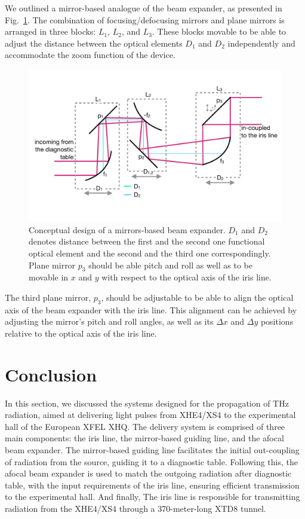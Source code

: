     We outlined a mirror-based analogue of the beam expander, as presented in Fig.~\ref{Fig:beam_expander}. The combination of focusing/defocusing mirrors and plane mirrors is arranged in three blocks: $L_1$, $L_2$, and $L_3$. These blocks movable to be able to adjust the distance between the optical elements $D_1$ and $D_2$ independently and accommodate the zoom function of the device.
    \begin{figure}[h]
    	\centering
    		\includegraphics[trim={0 0cm 0 0cm}, width=0.99\linewidth]{content/images/transport/beam_expander.pdf}
    		\centering
            \captionsetup{justification=centering}
        	\caption{Conceptual design of a mirrors-based beam expander. $D_1$ and $D_2$ denotes distance between the first and the second one functional optical element and the second and the third one correspondingly. Plane mirror $p_3$ should be able pitch and roll as well as to be movable in $x$ and $y$ with respect to the optical axis of the iris line.}
        \label{Fig:beam_expander}
    \end{figure}
    The third plane mirror, $p_3$, should be adjustable to be able to align the optical axis of the beam expander with the iris line. This alignment can be achieved by adjusting the mirror's pitch and roll angles, as well as its $\Delta x$ and $\Delta y$ positions relative to the optical axis of the iris line.
    
\section{Conclusion}
    
    In this section, we discussed the systems designed for the propagation of THz radiation, aimed at delivering light pulses from XHE4/XS4 to the experimental hall of the European XFEL XHQ. The delivery system is comprised of three main components: the iris line, the mirror-based guiding line, and the afocal beam expander. The mirror-based guiding line facilitates the initial out-coupling of radiation from the source, guiding it to a diagnostic table. Following this, the afocal beam expander is used to match the outgoing radiation after diagnostic table, with the input requirements of the iris line, ensuring efficient transmission to the experimental hall. And finally, The iris line is responsible for transmitting radiation from the XHE4/XS4 through a 370-meter-long XTD8 tunnel.
    
